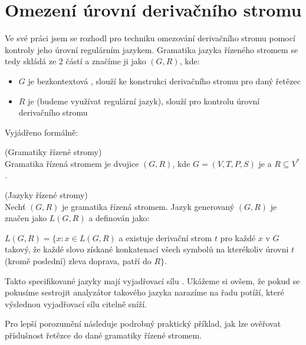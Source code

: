 \section{Omezení úrovní derivačního stromu}

Ve své práci jsem se rozhodl pro techniku omezování derivačního stromu pomocí
kontroly jeho úrovní regulárním jazykem.
Gramatika jazyka řízeného stromem se tedy skládá ze 2 částí a značíme ji jako
$(G, R)$, kde:
\begin{itemize}
  \item $G$ je bezkontextová , slouží ke konstrukci derivačního stromu
  pro daný řetězec
  \item $R$ je  (budeme využívat regulární jazyk),
  slouží pro kontrolu úrovní derivačního stromu
\end{itemize}

\noindent
Vyjádřeno formálně:

\begin{defn}
  (Gramatiky řízené stromy)\\
  Gramatika řízená stromem je dvojice $(G, R)$, kde $G = (V, T, P, S)$
  je  a $R \subseteq V^*$ .
\end{defn}

\begin{defn}
  \label{defn:treeControlledLanguages}
  (Jazyky řízené stromy)\\
  Nechť $(G, R)$ je gramatika řízená stromem.
  Jazyk generovaný $(G, R)$ je značen jako $L(G, R)$ a definován jako:
  \vspace{5pt}
  \begin{adjustwidth}{0.5cm}{0.5cm}
    $L(G, R) = \{x: x \in L(G, R)$ a existuje derivační strom $t$ pro
    každé $x$ v $G$ takový, že každé slovo získané konkatenací
    všech symbolů na kterékoliv úrovni $t$ (kromě poslední) zleva doprava,
    patří do $R \}$.
  \end{adjustwidth}
\end{defn}

\noindent
Takto specifikované jazyky mají vyjadřovací sílu .\cite{Koutny}
Ukážeme si ovšem, že pokud se pokusíme sestrojit analyzátor takového jazyka
narazíme na řadu potíží, které výslednou vyjadřovací sílu citelně sníží.

Pro lepší porozumění následuje podrobný praktický příklad, jak lze
ověřovat příslušnost řetězce do dané gramatiky řízené stromem.

